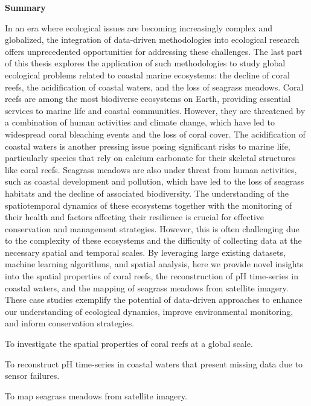 \thispagestyle{empty}

\begin{center}
    \textbf{\Large Summary}
\end{center}

In an era where ecological issues are becoming increasingly complex and
globalized, the integration of data-driven methodologies into ecological
research offers unprecedented opportunities for addressing these challenges.
The last part of this thesis explores the application of such methodologies to
study global ecological problems related to coastal marine ecosystems: the
decline of coral reefs, the acidification of coastal waters, and the loss of
seagrass meadows. Coral reefs are among the most biodiverse ecosystems on
Earth, providing essential services to marine life and coastal communities.
However, they are threatened by a combination of human activities and climate
change, which have led to widespread coral bleaching events and the loss of
coral cover. The acidification of coastal waters is another pressing issue
posing significant risks to marine life, particularly species that rely on
calcium carbonate for their skeletal structures like coral reefs. Seagrass
meadows are also under threat from human activities, such as coastal
development and pollution, which have led to the loss of seagrass habitats and
the decline of associated biodiversity. The understanding of the spatiotemporal
dynamics of these ecosystems together with the monitoring of their health and
factors affecting their resilience is crucial for effective conservation and
management strategies. However, this is often challenging due to the complexity
of these ecosystems and the difficulty of collecting data at the necessary
spatial and temporal scales. By leveraging large existing datasets, machine
learning algorithms, and spatial analysis, here we provide novel insights
into the spatial properties of coral reefs, the reconstruction of pH
time-series in coastal waters, and the mapping of seagrass meadows from
satellite imagery. These case studies exemplify the potential of data-driven
approaches to enhance our understanding of ecological dynamics, improve
environmental monitoring, and inform conservation strategies.

\vspace{1cm}

\begin{objectiveslist}
    \item To investigate the spatial properties of coral reefs at a global
    scale.
    \item To reconstruct pH time-series in coastal waters that present missing
    data due to sensor failures.
    \item To map seagrass meadows from satellite imagery.
\end{objectiveslist}

